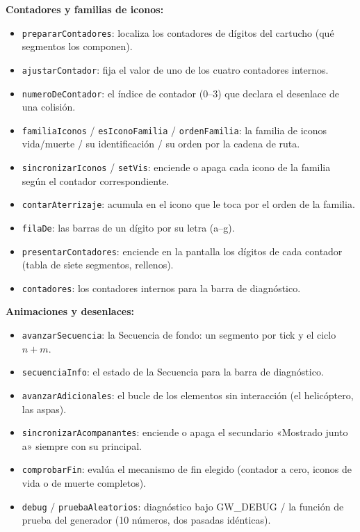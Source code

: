 \documentclass[../main.tex]{subfiles}
\begin{document}
	\textbf{Contadores y familias de iconos:}
	\begin{itemize}
		\item \texttt{prepararContadores}: localiza los contadores de
		dígitos del cartucho (qué segmentos los componen).
		\item \texttt{ajustarContador}: fija el valor de uno de los cuatro
		contadores internos.
		\item \texttt{numeroDeContador}: el índice de contador (0--3) que
		declara el desenlace de una colisión.
		\item \texttt{familiaIconos} / \texttt{esIconoFamilia} /
		\texttt{ordenFamilia}: la familia de iconos vida/muerte / su
		identificación / su orden por la cadena de ruta.
		\item \texttt{sincronizarIconos} / \texttt{setVis}: enciende o apaga
		cada icono de la familia según el contador correspondiente.
		\item \texttt{contarAterrizaje}: acumula en el icono que le toca por
		el orden de la familia.
		\item \texttt{filaDe}: las barras de un dígito por su letra (a--g).
		\item \texttt{presentarContadores}: enciende en la pantalla los
		dígitos de cada contador (tabla de siete segmentos, rellenos).
		\item \texttt{contadores}: los contadores internos para la barra de
		diagnóstico.
	\end{itemize}
	
	\textbf{Animaciones y desenlaces:}
	\begin{itemize}
		\item \texttt{avanzarSecuencia}: la Secuencia de fondo: un segmento
		por tick y el ciclo $n + m$.
		\item \texttt{secuenciaInfo}: el estado de la Secuencia para la
		barra de diagnóstico.
		\item \texttt{avanzarAdicionales}: el bucle de los elementos sin
		interacción (el helicóptero, las aspas).
		\item \texttt{sincronizarAcompanantes}: enciende o apaga el
		secundario «Mostrado junto a» siempre con su principal.
		\item \texttt{comprobarFin}: evalúa el mecanismo de fin elegido
		(contador a cero, iconos de vida o de muerte completos).
		\item \texttt{debug} / \texttt{pruebaAleatorios}: diagnóstico bajo
		GW\_DEBUG / la función de prueba del generador (10 números, dos
		pasadas idénticas).
	\end{itemize}
	
\end{document}
